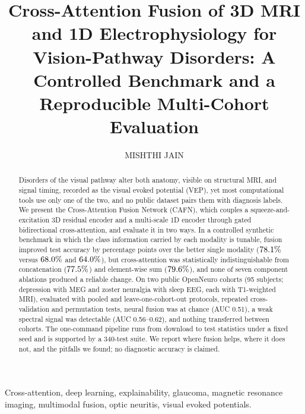 \documentclass{ieeeaccessapprox}
\title{Cross-Attention Fusion of 3D MRI and 1D Electrophysiology for Vision-Pathway Disorders: A Controlled Benchmark and a Reproducible Multi-Cohort Evaluation}
\author{\uppercase{Mishthi Jain}\authorrefmark{1}}
\begin{document}
\maketitle

\begin{abstract}
Disorders of the visual pathway alter both anatomy, visible on structural MRI, and signal timing, recorded as the visual evoked potential (VEP), yet most computational tools use only one of the two, and no public dataset pairs them with diagnosis labels. We present the Cross-Attention Fusion Network (CAFN), which couples a squeeze-and-excitation 3D residual encoder and a multi-scale 1D encoder through gated bidirectional cross-attention, and evaluate it in two ways. In a controlled synthetic benchmark in which the class information carried by each modality is tunable, fusion improved test accuracy by \gainUni{} percentage points over the better single modality ($78.1\%$ versus $68.0\%$ and $64.0\%$), but cross-attention was statistically indistinguishable from concatenation ($77.5\%$) and element-wise sum ($79.6\%$), and none of seven component ablations produced a reliable change. On two public OpenNeuro cohorts (95 subjects; depression with MEG and zoster neuralgia with sleep EEG, each with T1-weighted MRI), evaluated with pooled and leave-one-cohort-out protocols, repeated cross-validation and permutation tests, neural fusion was at chance (AUC 0.51), a weak spectral signal was detectable (AUC 0.56--0.62), and nothing transferred between cohorts. The one-command pipeline runs from download to test statistics under a fixed seed and is supported by a 340-test suite. We report where fusion helps, where it does not, and the pitfalls we found; no diagnostic accuracy is claimed.
\end{abstract}

\begin{keywords}
Cross-attention, deep learning, explainability, glaucoma, magnetic resonance imaging, multimodal fusion, optic neuritis, visual evoked potentials.
\end{keywords}

\titlepgskip=-15pt
\end{document}
